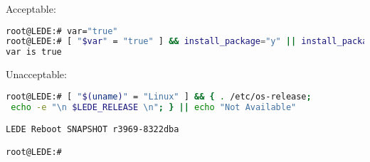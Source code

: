 
Acceptable:
\begin{lstlisting}[language=bash,caption={If statement simplification (I)}]
root@LEDE:# var="true"
root@LEDE:# [ "$var" = "true" ] && install_package="y" || install_package="n"
var is true
\end{lstlisting}
Unacceptable:
\begin{lstlisting}[language=bash,caption={If statement simplification (II)}]
root@LEDE:# [ "$(uname)" = "Linux" ] && { . /etc/os-release;
 echo -e "\n $LEDE_RELEASE \n"; } || echo "Not Available"

LEDE Reboot SNAPSHOT r3969-8322dba

root@LEDE:#
\end{lstlisting}
